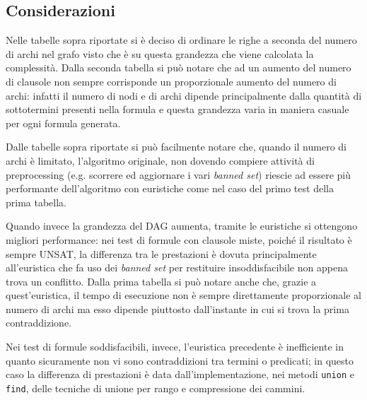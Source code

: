 \documentclass[a4paper,11pt]{article}
\begin{document}
\subsection{Considerazioni}
Nelle tabelle sopra riportate si è deciso di ordinare le righe a 
seconda del numero di archi nel grafo visto che è su questa grandezza 
che viene calcolata la complessità. Dalla seconda tabella si può 
notare che ad un aumento del numero di clausole non sempre corrisponde 
un proporzionale aumento del numero di archi: infatti il numero di nodi e di archi 
dipende principalmente dalla quantità di sottotermini presenti nella formula 
e questa grandezza varia in maniera casuale per ogni formula generata.\par
Dalle tabelle sopra riportate si può facilmente notare che, quando il numero di archi
è limitato, l'algoritmo originale, non dovendo compiere attività di preprocessing 
(e.g. scorrere ed aggiornare i vari \emph{banned set}) riescie ad essere più 
performante dell'algoritmo con euristiche come nel caso del primo test 
della prima tabella. \par 
Quando invece la grandezza del DAG aumenta, tramite le euristiche si 
ottengono migliori performance: nei test di formule con clausole miste, 
poiché il risultato è sempre UNSAT, la differenza tra le prestazioni è 
dovuta principalmente all'euristica che fa uso dei \emph{banned set} 
per restituire insoddisfacibile non appena trova un conflitto. Dalla 
prima tabella si può notare anche che, grazie a quest'euristica, il 
tempo di esecuzione non è sempre direttamente proporzionale al numero di 
archi ma esso dipende piuttosto dall'instante in cui si trova la prima 
contraddizione. \par
Nei test di formule soddisfacibili, invece, l'euristica precedente è 
inefficiente in quanto sicuramente non vi sono contraddizioni tra 
termini o predicati; in questo caso la differenza di prestazioni è data 
dall'implementazione, nei metodi \texttt{union} e \texttt{find}, delle 
tecniche di unione per rango e compressione dei cammini.
\end{document}
